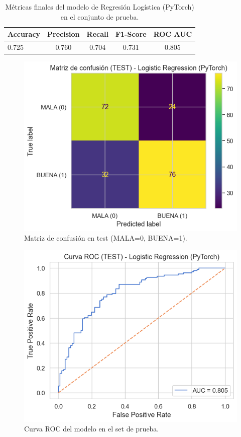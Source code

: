 
\begin{table}[t]
\centering
\caption{Métricas finales del modelo de Regresión Logística (PyTorch) en el conjunto de prueba.}
\label{tab:metrics-final-pytorch}
\begin{tabular}{lcccc}
\hline
Accuracy & Precision & Recall & F1-Score & ROC AUC \\
\hline
0.725 & 0.760 & 0.704 & 0.731 & 0.805 \\
\hline
\end{tabular}
\end{table}

\begin{figure}[t]
\centering
\includegraphics[width=0.75\linewidth]{confusion_matrix_pytorch.png}
\caption{Matriz de confusión en test (MALA=0, BUENA=1).}
\label{fig:cm-final-pytorch}
\end{figure}

\begin{figure}[t]
\centering
\includegraphics[width=0.75\linewidth]{roc_curve_pytorch.png}
\caption{Curva ROC del modelo en el set de prueba.}
\label{fig:roc-final-pytorch}
\end{figure}

